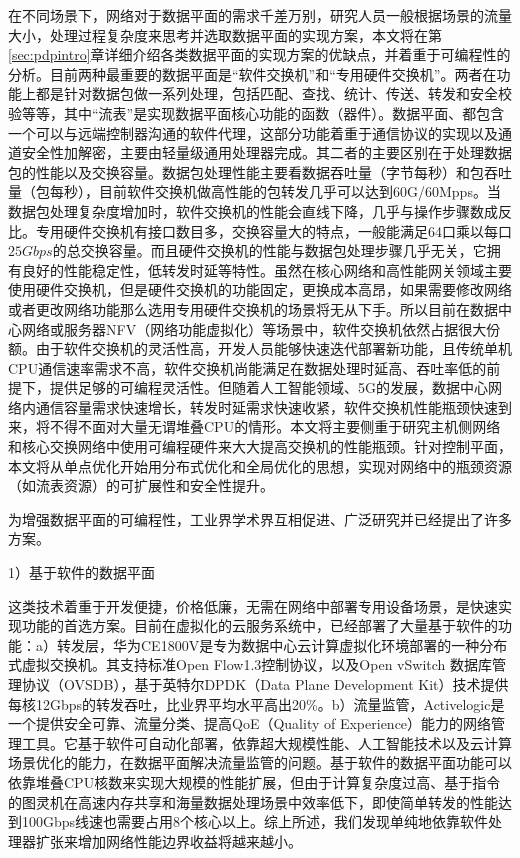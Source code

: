 在不同场景下，网络对于数据平面的需求千差万别，研究人员一般根据场景的流量大小，处理过程复杂度来思考并选取数据平面的实现方案，本文将在第\ref{sec:pdpintro}章详细介绍各类数据平面的实现方案的优缺点，并着重于可编程性的分析。目前两种最重要的数据平面是“软件交换机”和“专用硬件交换机”。两者在功能上都是针对数据包做一系列处理，包括匹配、查找、统计、传送、转发和安全校验等等，其中“流表”是实现数据平面核心功能的函数（器件）。数据平面、都包含一个可以与远端控制器沟通的软件代理，这部分功能着重于通信协议的实现以及通道安全性加解密，主要由轻量级通用处理器完成。其二者的主要区别在于处理数据包的性能以及交换容量。数据包处理性能主要看数据吞吐量（字节每秒）和包吞吐量（包每秒），目前软件交换机做高性能的包转发几乎可以达到60G/60Mpps。当数据包处理复杂度增加时，软件交换机的性能会直线下降，几乎与操作步骤数成反比。专用硬件交换机有接口数目多，交换容量大的特点，一般能满足64口乘以每口$25Gbps$的总交换容量。而且硬件交换机的性能与数据包处理步骤几乎无关，它拥有良好的性能稳定性，低转发时延等特性。虽然在核心网络和高性能网关领域主要使用硬件交换机，但是硬件交换机的功能固定，更换成本高昂，如果需要修改网络或者更改网络功能那么选用专用硬件交换机的场景将无从下手。所以目前在数据中心网络或服务器NFV（网络功能虚拟化）等场景中，软件交换机依然占据很大份额。由于软件交换机的灵活性高，开发人员能够快速迭代部署新功能，且传统单机CPU通信速率需求不高，软件交换机尚能满足在数据处理时延高、吞吐率低的前提下，提供足够的可编程灵活性。但随着人工智能领域、5G的发展，数据中心网络内通信容量需求快速增长，转发时延需求快速收紧，软件交换机性能瓶颈快速到来，将不得不面对大量无谓堆叠CPU的情形。本文将主要侧重于研究主机侧网络和核心交换网络中使用可编程硬件来大大提高交换机的性能瓶颈。针对控制平面，本文将从单点优化开始用分布式优化和全局优化的思想，实现对网络中的瓶颈资源（如流表资源）的可扩展性和安全性提升。


为增强数据平面的可编程性，工业界学术界互相促进、广泛研究并已经提出了许多方案。

1）基于软件的数据平面

这类技术着重于开发便捷，价格低廉，无需在网络中部署专用设备场景，是快速实现功能的首选方案。目前在虚拟化的云服务系统中，已经部署了大量基于软件的功能：a）转发层，华为CE1800V是专为数据中心云计算虚拟化环境部署的一种分布式虚拟交换机。其支持标准Open Flow1.3控制协议，以及Open vSwitch 数据库管理协议（OVSDB），基于英特尔DPDK（Data Plane Development Kit）技术提供每核12Gbps的转发吞吐，比业界平均水平高出20\%。b）流量监管，Activelogic是一个提供安全可靠、流量分类、提高QoE（Quality of Experience）能力的网络管理工具。它基于软件可自动化部署，依靠超大规模性能、人工智能技术以及云计算场景优化的能力，在数据平面解决流量监管的问题。基于软件的数据平面功能可以依靠堆叠CPU核数来实现大规模的性能扩展，但由于计算复杂度过高、基于指令的图灵机在高速内存共享和海量数据处理场景中效率低下，即使简单转发的性能达到100Gbps线速也需要占用8个核心以上。综上所述，我们发现单纯地依靠软件处理器扩张来增加网络性能边界收益将越来越小。

